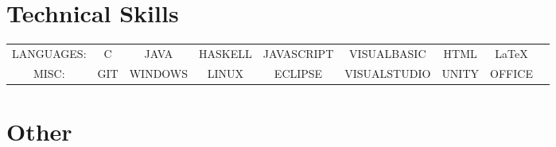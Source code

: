 \documentclass{cvclass}
\begin{document}
\section{Technical Skills}
\begin{tabular}{ c c c c c c c c c }
  LANGUAGES: & C & JAVA & HASKELL & JAVASCRIPT & VISUALBASIC & HTML & \LaTeX\\
  MISC: & GIT & WINDOWS & LINUX & ECLIPSE & VISUALSTUDIO & UNITY & OFFICE &
\end{tabular}\newline

\section{Other}
\end{document}
